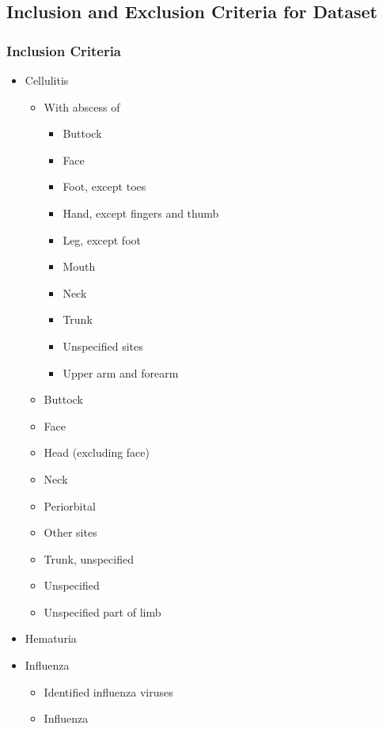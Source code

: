 

\subsection{Inclusion and Exclusion Criteria for Dataset}\label{sec:supp_criteria}

\subsubsection{Inclusion Criteria}
\begin{itemize}
    

    \item Cellulitis
    \begin{itemize}
        \item With abscess of
        \begin{itemize}
            \item Buttock
            \item Face
            \item Foot, except toes
            \item Hand, except fingers and thumb
            \item Leg, except foot
            \item Mouth
            \item Neck
            \item Trunk
            \item Unspecified sites
            \item Upper arm and forearm
        \end{itemize}
        \item Buttock
        \item Face
        \item Head (excluding face)
        \item Neck
        \item Periorbital
        \item Other sites
        \item Trunk, unspecified
        \item Unspecified
        \item Unspecified part of limb
    \end{itemize}
    
    \item Hematuria
    
    \item Influenza
    \begin{itemize}
        \item Identified influenza viruses
        \item Influenza
    \end{itemize}
    

\end{itemize}

